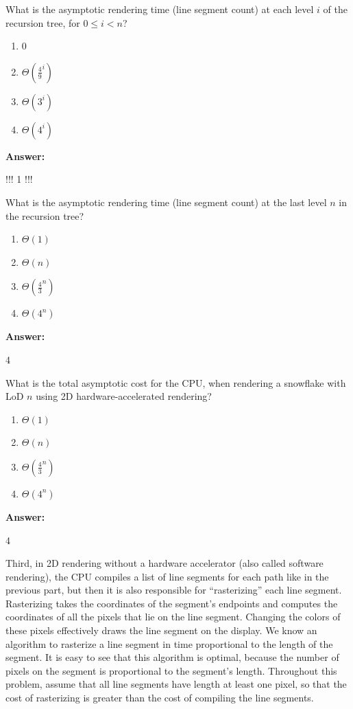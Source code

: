 \documentclass[12pt,twoside]{article}
\newcommand{\answer}{
 \par\medskip
 \textbf{Answer:}
}
\newcommand{\answerIj}{ \answer
!!! 1 !!!
}
\newcommand{\answerIk}{ \answer
4
}
\newcommand{\answerIl}{ \answer
4
}
\begin{document}
\begin{problems}
\begin{problemparts}
  \problempart {} What is the asymptotic rendering time (line segment count) at
  each level $i$ of the recursion tree, for $0 \le i < n$?
    \begin{enumerate}
      \item 0
      \item $\Theta(\frac{4}{9} ^ i)$
      \item $\Theta(3 ^ i)$
      \item $\Theta(4 ^ i)$
    \end{enumerate}
\answerIj

  \problempart {} What is the asymptotic rendering time (line segment count) at
  the last level $n$ in the recursion tree?
    \begin{enumerate}
      \item $\Theta(1)$
      \item $\Theta(n)$
      \item $\Theta(\frac{4}{3}^n)$
      \item $\Theta(4^n)$
    \end{enumerate}
\answerIk

  \problempart {} What is the total asymptotic cost for the CPU, when rendering
  a snowflake with LoD $n$ using 2D hardware-accelerated rendering?
    \begin{enumerate}
      \item $\Theta(1)$
      \item $\Theta(n)$
      \item $\Theta(\frac{4}{3}^n)$
      \item $\Theta(4^n)$
    \end{enumerate}
\answerIl

\end{problemparts}

Third, in 2D rendering without a hardware accelerator (also called
software rendering), the CPU compiles a list of line segments for each path like
in the previous part, but then it is also responsible for ``rasterizing'' each
line segment. Rasterizing takes the coordinates of the segment's endpoints and
computes the coordinates of all the pixels that lie on the line segment.
Changing the colors of these pixels effectively draws the line segment on the
display. We know an algorithm to rasterize a line segment in time proportional
to the length of the segment. It is easy to see that this algorithm is optimal,
because the number of pixels on the segment is proportional to the segment's
length. Throughout this problem, assume that all line segments have length
at least one pixel, so that the cost of rasterizing is greater than the cost
of compiling the line segments.


\end{problems}
\end{document}
